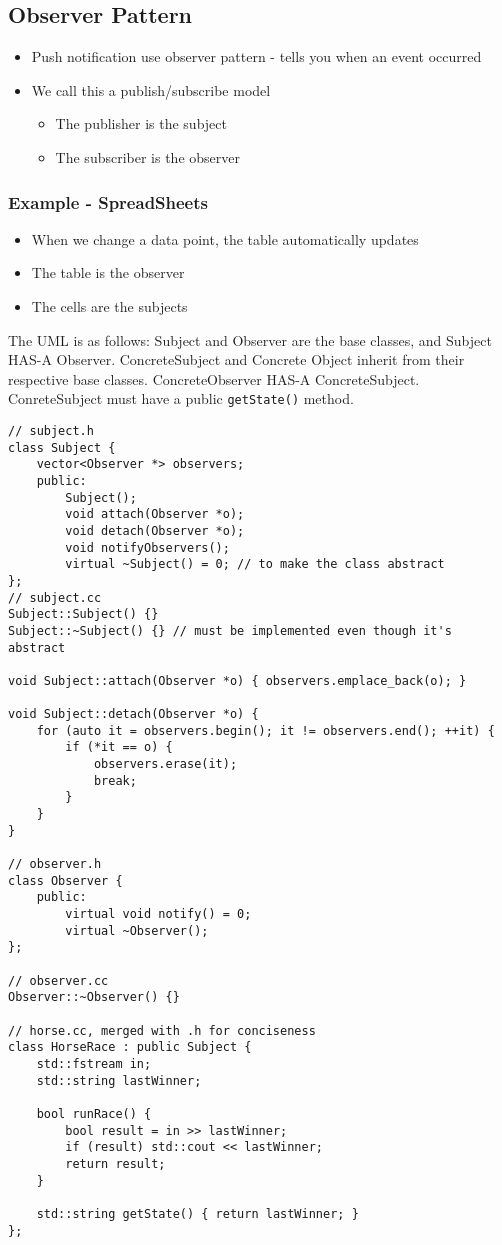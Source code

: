\documentclass[12pt]{article}
\begin{document}
\subsection{Observer Pattern}
\begin{itemize}
    \item Push notification use observer pattern - tells you when an event occurred
    \item We call this a publish/subscribe model
    \begin{itemize}
        \item The publisher is the subject
        \item The subscriber is the observer
    \end{itemize}
\end{itemize}
\subsubsection{Example - SpreadSheets}
\begin{itemize}
    \item When we change a data point, the table automatically updates
    \item The table is the observer
    \item The cells are the subjects
\end{itemize}
The UML is as follows: Subject and Observer are the base classes, and Subject HAS-A Observer. ConcreteSubject and Concrete Object inherit from their respective base classes. ConcreteObserver HAS-A ConcreteSubject. ConreteSubject must have a public \lstinline{getState()} method.
\begin{lstlisting}
// subject.h
class Subject {
    vector<Observer *> observers;
    public:
        Subject();
        void attach(Observer *o);
        void detach(Observer *o);
        void notifyObservers();
        virtual ~Subject() = 0; // to make the class abstract
};
// subject.cc
Subject::Subject() {}
Subject::~Subject() {} // must be implemented even though it's abstract

void Subject::attach(Observer *o) { observers.emplace_back(o); }

void Subject::detach(Observer *o) {
    for (auto it = observers.begin(); it != observers.end(); ++it) {
        if (*it == o) {
            observers.erase(it);
            break;
        }
    }
}

// observer.h
class Observer {
    public:
        virtual void notify() = 0;
        virtual ~Observer();
};

// observer.cc
Observer::~Observer() {}

// horse.cc, merged with .h for conciseness
class HorseRace : public Subject {
    std::fstream in;
    std::string lastWinner;
    
    bool runRace() {
        bool result = in >> lastWinner;
        if (result) std::cout << lastWinner;
        return result;
    }
    
    std::string getState() { return lastWinner; }
};

\end{lstlisting}
\end{document}
